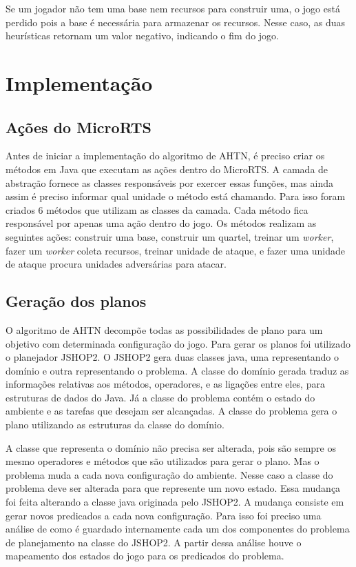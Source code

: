 Se um jogador não tem uma base nem recursos para construir uma, o jogo está perdido pois a base é necessária para armazenar os recursos. 
Nesse caso, as duas heurísticas retornam um valor negativo, indicando o fim do jogo. 

\section{Implementação}

\subsection{Ações do MicroRTS}

Antes de iniciar a implementação do algoritmo de AHTN, é preciso criar os métodos em Java que executam as ações dentro do MicroRTS.
A camada de abstração fornece as classes responsáveis por exercer essas funções, mas ainda assim é preciso informar qual unidade o método está chamando.
Para isso foram criados 6 métodos que utilizam as classes da camada.
Cada método fica responsável por apenas uma ação dentro do jogo.
Os métodos realizam as seguintes ações: construir uma base, construir um quartel, treinar um \textit{worker}, fazer um \textit{worker} coleta recursos, treinar unidade de ataque, e fazer uma unidade de ataque procura unidades adversárias para atacar.

\subsection{Geração dos planos}

O algoritmo de AHTN decompõe todas as possibilidades de plano para um objetivo com determinada configuração do jogo.
Para gerar os planos foi utilizado o planejador JSHOP2.
O JSHOP2 gera duas classes java, uma representando o domínio e outra representando o problema.
A classe do domínio gerada traduz as informações relativas aos métodos, operadores, e as ligações entre eles, para estruturas de dados do Java.
Já a classe do problema contém o estado do ambiente e as tarefas que desejam ser alcançadas.
A classe do problema gera o plano utilizando as estruturas da classe do domínio.

A classe que representa o domínio não precisa ser alterada, pois são sempre os mesmo operadores e métodos que são utilizados para gerar o plano.
Mas o problema muda a cada nova configuração do ambiente.
Nesse caso a classe do problema deve ser alterada para que represente um novo estado.
Essa mudança foi feita alterando a classe java originada pelo JSHOP2. 
A mudança consiste em gerar novos predicados a cada nova configuração.
Para isso foi preciso uma análise de como é guardado internamente cada um dos componentes do problema de planejamento na classe do JSHOP2.
A partir dessa análise houve o mapeamento dos estados do jogo para os predicados do problema.

